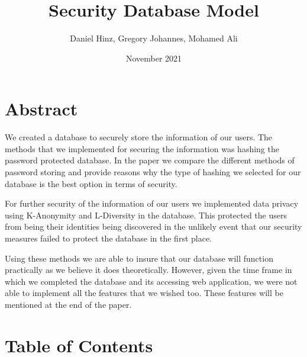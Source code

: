 \documentclass[12pt]{article}
\author{Daniel Hinz, Gregory Johannes, Mohamed Ali}
\date{November 2021}
\begin{document}
\title{Security Database Model}
\maketitle

{\centering \section*{\Large Abstract}}
We created a database to securely store the information of our users. The methods that we implemented for securing the information was hashing the password protected database. In the paper we compare the different methods of password storing and provide reasons why the type of hashing we selected for our database is the best option in terms of security.

For further security of the information of our users we implemented data privacy using K-Anonymity and L-Diversity in the database. This protected the users from being their identities being discovered in the unlikely event that our security measures failed to protect the database in the first place.

Using these methods we are able to insure that our database will function practically as we believe it does theoretically. However, given the time frame in which we completed the database and its accessing web application, we were not able to implement all the features that we wished too. These features will be mentioned at the end of the paper. 
\newpage
{\centering \section*{\Large Table of Contents~\\}}
\end{document}
